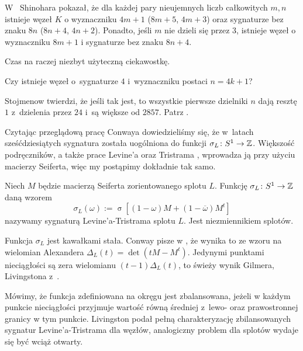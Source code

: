 W~\cite{shinohara71} Shinohara pokazał, że dla każdej pary nieujemnych liczb całkowitych $m, n$ istnieje węzeł $K$ o wyznaczniku $4m+1$ ($8m+5$, $4m+3$) oraz sygnaturze bez znaku $8n$ ($8n+4$, $4n+2$).
%
%
Ponadto, jeśli $m$ nie dzieli się przez $3$, istnieje węzeł o wyznaczniku $8m+1$ i sygnaturze bez znaku $8n+4$.

Czas na raczej niezbyt użyteczną ciekawostkę.

\begin{conjecture}
    Czy istnieje węzeł o~sygnaturze $4$ i~wyznaczniku postaci $n = 4k + 1$?
\end{conjecture}

Stojmenow twierdzi, że jeśli tak jest, to wszystkie pierwsze dzielniki $n$ dają resztę $1$ z~dzielenia przez $24$ i~są większe od $2857$.
%
Patrz \cite[s. 540]{ohtsuki02}.

Czytając przeglądową pracę Conwaya \cite{conway19} dowiedzieliśmy się, że w~latach sześćdziesiątych sygnatura została uogólniona do funkcji $\sigma_L \colon S^1 \to \mathbb Z$.
%
Większość podręczników, a także prace Levine'a \cite{levine69} oraz Tristrama \cite{tristram69}, wprowadza ją przy użyciu macierzy Seiferta, więc my postąpimy dokładnie tak samo.
%
%

\begin{definition}
%
    Niech $M$ będzie macierzą Seiferta zorientowanego splotu $L$.
    Funkcję $\sigma_L \colon S^1 \to \mathbb Z$ daną wzorem
    \begin{equation}
        \sigma_L(\omega) := \operatorname{\sigma} [(1-\omega) M + (1 - \overline{\omega})M^t]
    \end{equation}
    nazywamy sygnaturą Levine'a-Tristrama splotu $L$.
    Jest niezmiennikiem splotów.
\end{definition}

Funkcja $\sigma_L$ jest kawałkami stała.
Conway pisze w \cite{conway19}, że wynika to ze wzoru na wielomian Alexandera $\Delta_L(t) = \det(tM - M^t)$.
%
%
Jedynymi punktami nieciągłości są zera wielomianu $(t-1)\Delta_L(t)$, to świeży wynik Gilmera, Livingstona z~\cite{gilmer16}.
%
%

Mówimy, że funkcja zdefiniowana na okręgu jest zbalansowana, jeżeli w każdym punkcie nieciągłości przyjmuje wartość równą średniej z~lewo- oraz prawostronnej granicy w tym punkcie.
Livingston podał pełną charakteryzację zbilansowanych sygnatur Levine'a-Tristrama dla węzłów, analogiczny problem dla splotów wydaje się być wciąż otwarty.


